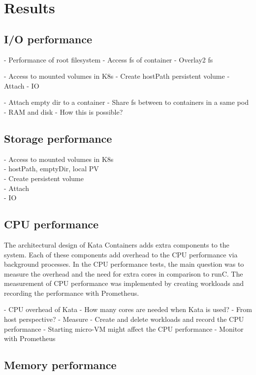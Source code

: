 \section{Results}

\subsection{I/O performance}






- Performance of root filesystem
	- Access fs of container
	- Overlay2 fs

- Access to mounted volumes in K8s
	- Create hostPath persistent volume
	- Attach
	- IO

- Attach empty dir to a container
	- Share fs between to containers in a same pod
	- RAM and disk
	- How this is possible?

\subsection{Storage performance}

- Access to mounted volumes in K8s \\
    - hostPath, emptyDir, local PV \\
	- Create persistent volume \\
	- Attach \\
	- IO

\subsection{CPU performance}

The architectural design of Kata Containers adds extra components to the system. Each of these components add overhead to the CPU performance via background processes. In the CPU performance tests, the main question was to measure the overhead and the need for extra cores in comparison to runC. The measurement of CPU performance was implemented by creating workloads and recording the performance with Prometheus. 

- CPU overhead of Kata
	- How many cores are needed when Kata is used?
	- From host perspective?
	- Measure
		- Create and delete workloads and record the CPU performance
			- Starting micro-VM might affect the CPU performance
			- Monitor with Prometheus

\subsection{Memory performance}

